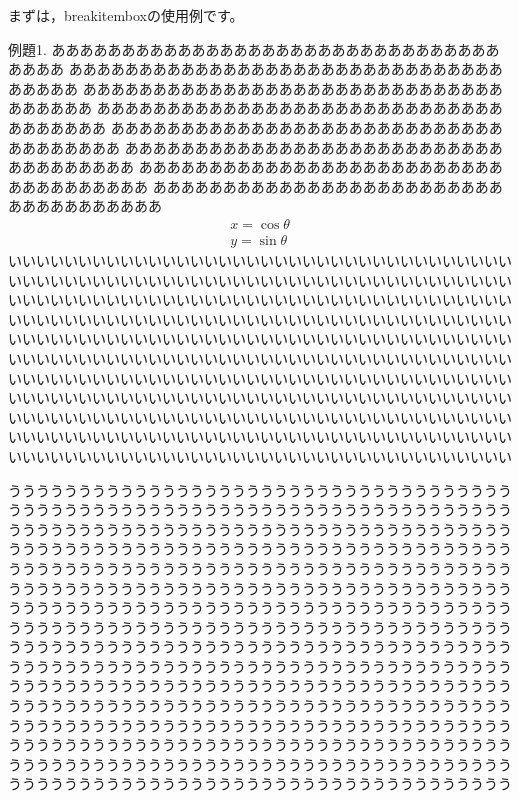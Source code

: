 \documentclass{jarticle}
\begin{document}
まずは，\textsf{breakitembox}の使用例です。
\def\breakboxparindent{1zw}%
\begin{breakitembox}{例題1.}
ああああああああああああああああああああああああああああああああああああ
ああああああああああああああああああああああああああああああああああああ
ああああああああああああああああああああああああああああああああああああ
ああああああああああああああああああああああああああああああああああああ
ああああああああああああああああああああああああああああああああああああ
ああああああああああああああああああああああああああああああああああああ
ああああああああああああああああああああああああああああああああああああ
ああああああああああああああああああああああああああああああああああああ
\begin{align}
  x=\cos\theta\\
  y=\sin\theta
\end{align}
いいいいいいいいいいいいいいいいいいいいいいいいいいいいいいいいいいいい
いいいいいいいいいいいいいいいいいいいいいいいいいいいいいいいいいいいい
いいいいいいいいいいいいいいいいいいいいいいいいいいいいいいいいいいいい
いいいいいいいいいいいいいいいいいいいいいいいいいいいいいいいいいいいい
いいいいいいいいいいいいいいいいいいいいいいいいいいいいいいいいいいいい
いいいいいいいいいいいいいいいいいいいいいいいいいいいいいいいいいいいい
いいいいいいいいいいいいいいいいいいいいいいいいいいいいいいいいいいいい
いいいいいいいいいいいいいいいいいいいいいいいいいいいいいいいいいいいい
いいいいいいいいいいいいいいいいいいいいいいいいいいいいいいいいいいいい
いいいいいいいいいいいいいいいいいいいいいいいいいいいいいいいいいいいい
いいいいいいいいいいいいいいいいいいいいいいいいいいいいいいいいいいいい

うううううううううううううううううううううううううううううううううううう
うううううううううううううううううううううううううううううううううううう
うううううううううううううううううううううううううううううううううううう
うううううううううううううううううううううううううううううううううううう
うううううううううううううううううううううううううううううううううううう
うううううううううううううううううううううううううううううううううううう
うううううううううううううううううううううううううううううううううううう
うううううううううううううううううううううううううううううううううううう
うううううううううううううううううううううううううううううううううううう
うううううううううううううううううううううううううううううううううううう
うううううううううううううううううううううううううううううううううううう
うううううううううううううううううううううううううううううううううううう
うううううううううううううううううううううううううううううううううううう
うううううううううううううううううううううううううううううううううううう
うううううううううううううううううううううううううううううううううううう
うううううううううううううううううううううううううううううううううううう
\end{breakitembox}
\end{document}

